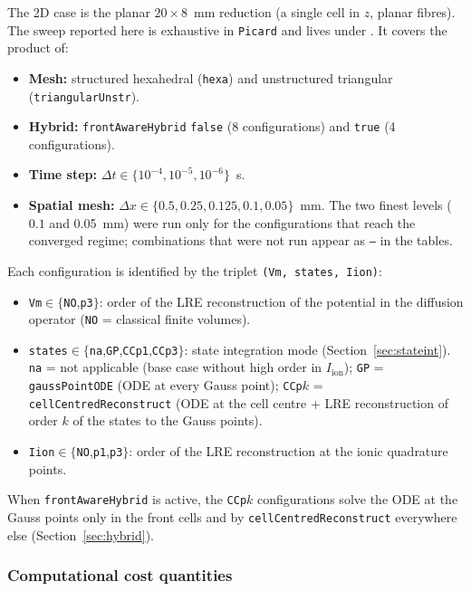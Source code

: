 \documentclass[11pt,a4paper]{article}
\newcommand{\code}[1]{\texttt{\small #1}}
\newcommand{\Iion}{I_{\mathrm{ion}}}
\begin{document}
The 2D case is the planar $20\times 8$~mm reduction (a single cell in $z$, planar
fibres). The sweep reported here is exhaustive in \code{Picard} and lives under
.
It covers the product of:
\begin{itemize}[topsep=2pt,itemsep=1pt]
  \item \textbf{Mesh:} structured hexahedral (\code{hexa}) and unstructured
        triangular (\code{triangularUnstr}).
  \item \textbf{Hybrid:} \code{frontAwareHybrid} \code{false} (8 configurations) and
        \code{true} (4 configurations).
  \item \textbf{Time step:} $\Delta t\in\{10^{-4},10^{-5},10^{-6}\}$~s.
  \item \textbf{Spatial mesh:} $\Delta x\in\{0.5,0.25,0.125,0.1,0.05\}$~mm. The two
        finest levels ($0.1$ and \SI{0.05}{mm}) were run only for the
        configurations that reach the converged regime; combinations that were not
        run appear as \texttt{--} in the tables.
\end{itemize}
Each configuration is identified by the triplet \code{(Vm, states, Iion)}:
\begin{itemize}[topsep=2pt,itemsep=1pt]
  \item \code{Vm}$\in\{$\code{NO},\code{p3}$\}$: order of the LRE reconstruction of the
        potential in the diffusion operator (\code{NO} = classical finite volumes).
  \item \code{states}$\in\{$\code{na},\code{GP},\code{CCp1},\code{CCp3}$\}$: state
        integration mode (Section~\ref{sec:stateint}). \code{na} = not applicable
        (base case without high order in $\Iion$); \code{GP} = \code{gaussPointODE} (ODE
        at every Gauss point); \code{CCp$k$} = \code{cellCentredReconstruct} (ODE
        at the cell centre + LRE reconstruction of order $k$ of the states to the
        Gauss points).
  \item \code{Iion}$\in\{$\code{NO},\code{p1},\code{p3}$\}$: order of the LRE
        reconstruction at the ionic quadrature points.
\end{itemize}
When \code{frontAwareHybrid} is active, the \code{CCp$k$} configurations
solve the ODE at the Gauss points only in the front cells and by
\code{cellCentredReconstruct} everywhere else (Section~\ref{sec:hybrid}).

\subsubsection{Computational cost quantities}
\label{sec:res2d:cost}
\end{document}
